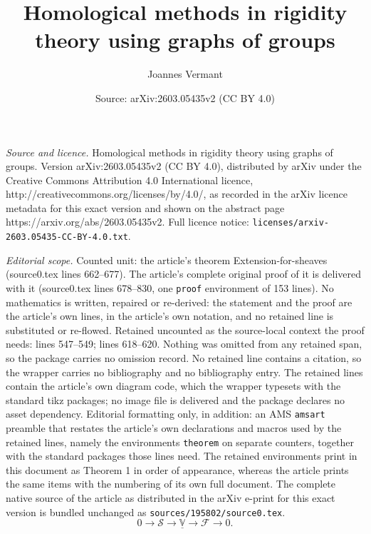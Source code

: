 \documentclass[10pt,a4paper]{amsart}
\title{Homological methods in rigidity theory using graphs of groups}
\author{Joannes Vermant}
\date{Source: arXiv:2603.05435v2 (CC BY 4.0)}
\begin{document}
\maketitle

\noindent\emph{Source and licence.} Homological methods in rigidity theory using graphs of groups. Version arXiv:2603.05435v2 (CC BY 4.0), distributed by arXiv under the Creative Commons Attribution 4.0 International licence, http://creativecommons.org/licenses/by/4.0/, as recorded in the arXiv licence metadata for this exact version and shown on the abstract page https://arxiv.org/abs/2603.05435v2. Full licence notice: \texttt{licenses/arxiv-2603.05435-CC-BY-4.0.txt}.\par\smallskip

\noindent\textit{Editorial scope.} Counted unit: the article's theorem Extension-for-sheaves (source0.tex lines 662--677). The article's complete original proof of it is delivered with it (source0.tex lines 678--830, one \texttt{proof} environment of 153 lines). No mathematics is written, repaired or re-derived: the statement and the proof are the article's own lines, in the article's own notation, and no retained line is substituted or re-flowed.  Retained uncounted as the source-local context the proof needs: lines 547--549; lines 618--620.  Nothing was omitted from any retained span, so the package carries no omission record.  No retained line contains a citation, so the wrapper carries no bibliography and no bibliography entry.  The retained lines contain the article's own diagram code, which the wrapper typesets with the standard tikz packages; no image file is delivered and the package declares no asset dependency.  Editorial formatting only, in addition: an AMS \texttt{amsart} preamble that restates the article's own declarations and macros used by the retained lines, namely the environments \texttt{theorem} on separate counters, together with the standard packages those lines need.  The retained environments print in this document as Theorem 1 in order of appearance, whereas the article prints the same items with the numbering of its own full document.  The complete native source of the article as distributed in the arXiv e-print for this exact version is bundled unchanged as \texttt{sources/195802/source0.tex}.
\begin{equation}\label{eq: les-ass}
    0 \rightarrow \mathcal{S} \rightarrow \underline{\mathbb{V}} \rightarrow \mathcal{F} \rightarrow 0. 
\end{equation}
\end{document}
